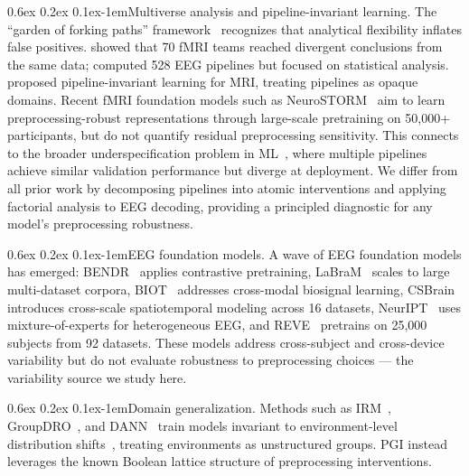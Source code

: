 \documentclass{article}
\makeatletter
\renewcommand{\paragraph}{\@startsection{paragraph}{4}{\z@}%
  {0.6ex \@plus 0.2ex \@minus 0.1ex}{-1em}{\normalsize\bf}}
\makeatother
\begin{document}
\paragraph{Multiverse analysis and pipeline-invariant learning.}
The ``garden of forking paths'' framework~\citep{steegen2016increasing} recognizes that analytical flexibility inflates false positives.
\citet{botvinik2020variability} showed that 70 fMRI teams reached divergent conclusions from the same data; \citet{eegmultiverse2025} computed 528 EEG pipelines but focused on statistical analysis.
\citet{li2022pipeline} proposed pipeline-invariant learning for MRI, treating pipelines as opaque domains. Recent fMRI foundation models such as NeuroSTORM~\citep{wang2026neurostorm} aim to learn preprocessing-robust representations through large-scale pretraining on 50,000+ participants, but do not quantify residual preprocessing sensitivity. This connects to the broader underspecification problem in ML~\citep{damour2022underspecification}, where multiple pipelines achieve similar validation performance but diverge at deployment. We differ from all prior work by decomposing pipelines into atomic interventions and applying factorial analysis to EEG decoding, providing a principled diagnostic for any model's preprocessing robustness.

\paragraph{EEG foundation models.}
A wave of EEG foundation models has emerged: BENDR~\citep{kostas2021bendr} applies contrastive pretraining, LaBraM~\citep{jiang2024large} scales to large multi-dataset corpora, BIOT~\citep{yang2023biot} addresses cross-modal biosignal learning, CSBrain~\citep{csbrain2025} introduces cross-scale spatiotemporal modeling across 16 datasets, NeurIPT~\citep{neuript2025} uses mixture-of-experts for heterogeneous EEG, and REVE~\citep{reve2025} pretrains on 25,000 subjects from 92 datasets. These models address cross-subject and cross-device variability but do not evaluate robustness to preprocessing choices --- the variability source we study here.

\paragraph{Domain generalization.}
Methods such as IRM~\citep{arjovsky2019invariant}, GroupDRO~\citep{sagawa2020distributionally}, and DANN~\citep{ganin2016domain} train models invariant to environment-level distribution shifts~\citep{zhou2022domain}, treating environments as unstructured groups. PGI instead leverages the known Boolean lattice structure of preprocessing interventions.
\end{document}
